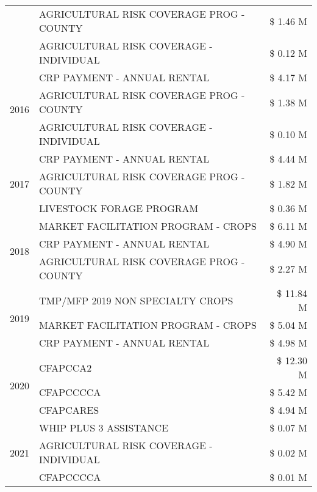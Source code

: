 \begin{tabular}{llr}
 & AGRICULTURAL RISK COVERAGE PROG - COUNTY & \$ 1.46 M \\
 & AGRICULTURAL RISK COVERAGE - INDIVIDUAL & \$ 0.12 M \\
\cline{1-3}
\multirow[t]{3}{*}{2016} & CRP PAYMENT - ANNUAL RENTAL & \$ 4.17 M \\
 & AGRICULTURAL RISK COVERAGE PROG - COUNTY & \$ 1.38 M \\
 & AGRICULTURAL RISK COVERAGE - INDIVIDUAL & \$ 0.10 M \\
\cline{1-3}
\multirow[t]{3}{*}{2017} & CRP PAYMENT - ANNUAL RENTAL & \$ 4.44 M \\
 & AGRICULTURAL RISK COVERAGE PROG - COUNTY & \$ 1.82 M \\
 & LIVESTOCK FORAGE PROGRAM & \$ 0.36 M \\
\cline{1-3}
\multirow[t]{3}{*}{2018} & MARKET FACILITATION PROGRAM - CROPS & \$ 6.11 M \\
 & CRP PAYMENT - ANNUAL RENTAL & \$ 4.90 M \\
 & AGRICULTURAL RISK COVERAGE PROG - COUNTY & \$ 2.27 M \\
\cline{1-3}
\multirow[t]{3}{*}{2019} & TMP/MFP 2019 NON SPECIALTY CROPS & \$ 11.84 M \\
 & MARKET FACILITATION PROGRAM - CROPS & \$ 5.04 M \\
 & CRP PAYMENT - ANNUAL RENTAL & \$ 4.98 M \\
\cline{1-3}
\multirow[t]{3}{*}{2020} & CFAPCCA2 & \$ 12.30 M \\
 & CFAPCCCCA & \$ 5.42 M \\
 & CFAPCARES & \$ 4.94 M \\
\cline{1-3}
\multirow[t]{3}{*}{2021} & WHIP PLUS 3 ASSISTANCE & \$ 0.07 M \\
 & AGRICULTURAL RISK COVERAGE - INDIVIDUAL & \$ 0.02 M \\
 & CFAPCCCCA & \$ 0.01 M \\
\cline{1-3}
\bottomrule
\end{tabular}
